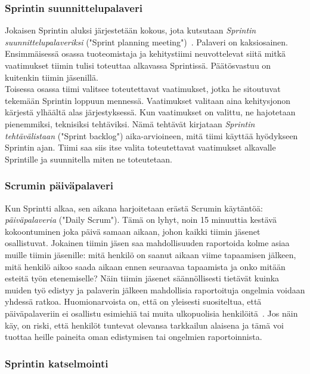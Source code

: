 \documentclass[finnish]{../tktltiki2}
\theoremstyle{definition}
\theoremstyle{remark}
\begin{document}
\subsubsection{Sprintin suunnittelupalaveri}

Jokaisen Sprintin aluksi järjestetään kokous, jota kutsutaan \emph{Sprintin suunnittelupalaveriksi} ("Sprint planning meeting")~\cite{ScrumHandBook}. Palaveri on kaksiosainen.
Ensimmäisessä osassa tuoteomistaja ja kehitystiimi neuvottelevat
siitä mitkä vaatimukset tiimin tulisi toteuttaa alkavassa
Sprintissä. Päätösvastuu on kuitenkin tiimin jäsenillä.\\

Toisessa osassa tiimi valitsee toteutettavat vaatimukset, jotka
he sitoutuvat tekemään Sprintin loppuun mennessä. Vaatimukset
valitaan aina kehitysjonon kärjestä ylhäältä alas järjestyksessä.
Kun vaatimukset on valittu, ne hajotetaan pienemmiksi, teknisiksi
tehtäviksi. Nämä tehtävät kirjataan \emph{Sprintin tehtävälistaan} ("Sprint backlog") aika-arvioineen, mitä tiimi käyttää hyödykseen Sprintin ajan. Tiimi saa siis itse valita toteutettavat vaatimukset alkavalle Sprintille ja suunnitella miten ne toteutetaan.

\subsubsection{Scrumin päiväpalaveri}

Kun Sprintti alkaa, sen aikana harjoitetaan erästä Scrumin käytäntöä:
\emph{päiväpalaveria} ("Daily Scrum"). Tämä on lyhyt, noin 15 minuuttia kestävä kokoontuminen joka päivä samaan aikaan, johon
kaikki tiimin jäsenet osallistuvat. Jokainen tiimin jäsen saa
mahdollisuuden raportoida kolme asiaa muille tiimin jäsenille:
mitä henkilö on saanut aikaan viime tapaamisen jälkeen, mitä henkilö
aikoo saada aikaan ennen seuraavaa tapaamista ja onko mitään
esteitä työn etenemiselle? Näin tiimin jäsenet säännöllisesti tietävät
kuinka muiden työ edistyy ja palaverin jälkeen mahdollisia raportoituja
ongelmia voidaan yhdessä ratkoa. Huomionarvoista on, että on yleisesti
suositeltua, että päiväpalaveriin ei osallistu esimiehiä tai muita
ulkopuolisia henkilöitä~\cite{ScrumHandBook}. Jos näin käy, on riski,
että henkilöt tuntevat olevansa tarkkailun alaisena ja tämä voi
tuottaa heille paineita oman edistymisen tai ongelmien raportoinnista.

\subsubsection{Sprintin katselmointi}
\end{document}

